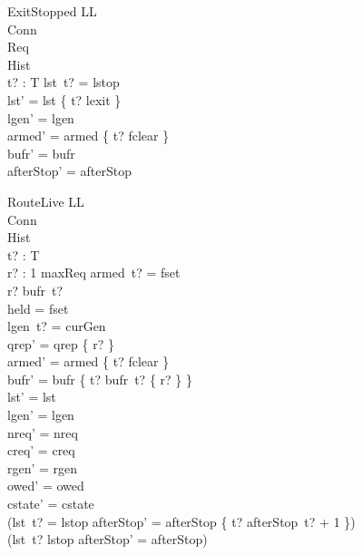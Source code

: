 \documentclass[a4paper,10pt,fleqn]{article}
\begin{document}
\begin{schema}{ExitStopped}
  \Delta LL \\
  \Xi Conn \\
  \Xi Req \\
  \Xi Hist \\
  t? : T
\where
  lst~t? = lstop \\
  lst' = lst \oplus \{ t? \mapsto lexit \} \\
  lgen' = lgen \\
  armed' = armed \oplus \{ t? \mapsto fclear \} \\
  bufr' = bufr \\
  afterStop' = afterStop
\end{schema}

\begin{schema}{RouteLive}
  \Delta LL \\
  \Xi Conn \\
  \Xi Hist \\
  t? : T \\
  r? : 1 \upto maxReq
\where
  armed~t? = fset \\
  r? \in bufr~t? \\
  held = fset \\
  lgen~t? = curGen \\
  qrep' = qrep \cup \{ r? \} \\
  armed' = armed \oplus \{ t? \mapsto fclear \} \\
  bufr' = bufr \oplus \{ t? \mapsto bufr~t? \setminus \{ r? \} \} \\
  lst' = lst \\
  lgen' = lgen \\
  nreq' = nreq \\
  creq' = creq \\
  rgen' = rgen \\
  owed' = owed \\
  cstate' = cstate \\
  (lst~t? = lstop \implies
    afterStop' = afterStop \oplus \{ t? \mapsto afterStop~t? + 1 \}) \\
  (lst~t? \neq lstop \implies afterStop' = afterStop)
\end{schema}
\end{document}
